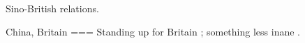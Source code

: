 Sino-British relations.

China, Britain
===
Standing up for Britain \parencite{holmes2024}; something less inane \parencite{patten2023}.